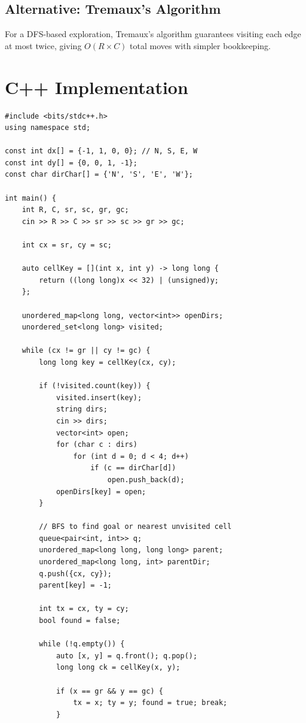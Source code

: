 \documentclass[11pt,a4paper]{article}
\begin{document}
\subsection{Alternative: Tremaux's Algorithm}
For a DFS-based exploration, Tremaux's algorithm guarantees visiting
each edge at most twice, giving $O(R \times C)$ total moves with
simpler bookkeeping.

\section{C++ Implementation}

\begin{lstlisting}
#include <bits/stdc++.h>
using namespace std;

const int dx[] = {-1, 1, 0, 0}; // N, S, E, W
const int dy[] = {0, 0, 1, -1};
const char dirChar[] = {'N', 'S', 'E', 'W'};

int main() {
    int R, C, sr, sc, gr, gc;
    cin >> R >> C >> sr >> sc >> gr >> gc;

    int cx = sr, cy = sc;

    auto cellKey = [](int x, int y) -> long long {
        return ((long long)x << 32) | (unsigned)y;
    };

    unordered_map<long long, vector<int>> openDirs;
    unordered_set<long long> visited;

    while (cx != gr || cy != gc) {
        long long key = cellKey(cx, cy);

        if (!visited.count(key)) {
            visited.insert(key);
            string dirs;
            cin >> dirs;
            vector<int> open;
            for (char c : dirs)
                for (int d = 0; d < 4; d++)
                    if (c == dirChar[d])
                        open.push_back(d);
            openDirs[key] = open;
        }

        // BFS to find goal or nearest unvisited cell
        queue<pair<int, int>> q;
        unordered_map<long long, long long> parent;
        unordered_map<long long, int> parentDir;
        q.push({cx, cy});
        parent[key] = -1;

        int tx = cx, ty = cy;
        bool found = false;

        while (!q.empty()) {
            auto [x, y] = q.front(); q.pop();
            long long ck = cellKey(x, y);

            if (x == gr && y == gc) {
                tx = x; ty = y; found = true; break;
            }


\end{lstlisting}
\end{document}
